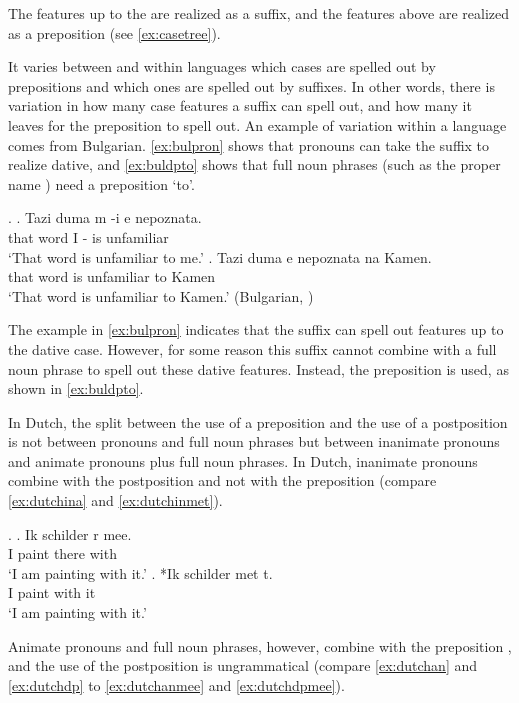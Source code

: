 \documentclass[11pt,a4paper]{article}
\begin{document}
The features up to the  are realized as a suffix, and the features above  are realized as a preposition (see \ref{ex:casetree}).

It varies between and within languages which cases are spelled out by prepositions and which ones are spelled out by suffixes. In other words, there is variation in how many case features a suffix can spell out, and how many it leaves for the preposition to spell out. An example of variation within a language comes from Bulgarian. \ref{ex:bulpron} shows that pronouns can take the suffix  to realize dative, and \ref{ex:buldpto} shows that full noun phrases (such as the proper name ) need a preposition  `to'.

\ex.\label{ex:bulgarian}
\ag. Tazi duma m -i e nepoznata.\\
that word I - is unfamiliar\\
`That word is unfamiliar to me.'\label{ex:bulpron}
\bg. Tazi duma e nepoznata na Kamen.\\
that word is unfamiliar to Kamen\\
`That word is unfamiliar to Kamen.'\label{ex:buldpto} \hfill (Bulgarian, \citealt[39]{caha2009})

The example in \ref{ex:bulpron} indicates that the suffix  can spell out features up to the dative case. However, for some reason this suffix cannot combine with a full noun phrase to spell out these dative features. Instead, the preposition  is used, as shown in \ref{ex:buldpto}.

In Dutch, the split between the use of a preposition and the use of a postposition is not between pronouns and full noun phrases but between inanimate pronouns and animate pronouns plus full noun phrases. In Dutch, inanimate pronouns combine with the postposition  and not with the preposition  (compare \ref{ex:dutchina} and \ref{ex:dutchinmet}).

\ex.
\ag. Ik schilder r mee.\\
 I paint there with\\
 `I am painting with it.'\label{ex:dutchina}
\bg. *Ik schilder met t.\\
 I paint with it\\
 `I am painting with it.'\label{ex:dutchinmet}

Animate pronouns and full noun phrases, however, combine with the preposition , and the use of the postposition  is ungrammatical (compare \ref{ex:dutchan} and \ref{ex:dutchdp} to \ref{ex:dutchanmee} and \ref{ex:dutchdpmee}).
\end{document}
